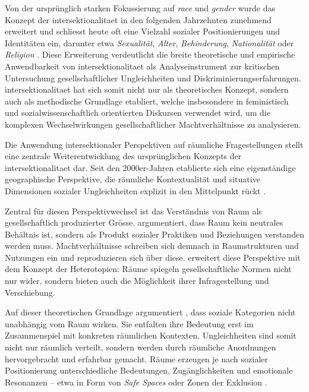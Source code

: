 Von der ursprünglich starken Fokussierung auf \textit{race} und \textit{gender} wurde das Konzept der \gls{intersektionalitaet} in den folgenden Jahrzehnten zunehmend erweitert und schliesst heute oft eine Vielzahl sozialer Positionierungen und Identitäten ein, darunter etwa \emph{Sexualität}, \emph{Alter}, \emph{Behinderung}, \emph{Nationalität} oder \emph{Religion} \parencite{bauerIntersectionalityQuantitativeResearch2021, bowlegInvitedReflectionQuantifying2016}. Diese Erweiterung verdeutlicht die breite theoretische und empirische Anwendbarkeit von \gls{intersektionalitaet} als Analyseinstrument zur kritischen Untersuchung gesellschaftlicher Ungleichheiten und Diskriminierungserfahrungen. \gls{intersektionalitaet} hat sich somit nicht nur als theoretisches Konzept, sondern auch als methodische Grundlage etabliert, welche insbesondere in feministisch und sozialwissenschaftlich orientierten Diskursen verwendet wird, um die komplexen Wechselwirkungen gesellschaftlicher Machtverhältnisse zu analysieren.

\vspace{2em}

Die Anwendung intersektionaler Perspektiven auf räumliche Fragestellungen stellt eine zentrale Weiterentwicklung des ursprünglichen Konzepts der \gls{intersektionalitaet} dar. Seit den 2000er-Jahren etablierte sich eine eigenständige geographische Perspektive, die räumliche Kontextualität und situative Dimensionen sozialer Ungleichheiten explizit in den Mittelpunkt rückt \parencite{valentineTheorizingResearchingIntersectionality2007,rodo-de-zarateIntersectionalityFeministGeographies2018}.

Zentral für diesen Perspektivwechsel ist das Verständnis von Raum als gesellschaftlich produzierter Grösse. \textcite{lefebvreProductionLespace1974} argumentiert, dass Raum kein neutrales Behältnis ist, sondern als Produkt sozialer Praktiken und Beziehungen verstanden werden muss. Machtverhältnisse schreiben sich demnach in Raumstrukturen und Nutzungen ein und reproduzieren sich über diese. \textcite{foucaultEspacesAutres2004} erweitert diese Perspektive mit dem Konzept der Heterotopien: Räume spiegeln gesellschaftliche Normen nicht nur wider, sondern bieten auch die Möglichkeit ihrer Infragestellung und Verschiebung.

Auf dieser theoretischen Grundlage argumentiert \textcite{valentineTheorizingResearchingIntersectionality2007}, dass soziale Kategorien nicht unabhängig vom Raum wirken. Sie entfalten ihre Bedeutung erst im Zusammenspiel mit konkreten räumlichen Kontexten. Ungleichheiten sind somit nicht nur räumlich verteilt, sondern werden durch räumliche Anordnungen hervorgebracht und erfahrbar gemacht. Räume erzeugen je nach sozialer Positionierung unterschiedliche Bedeutungen, Zugänglichkeiten und emotionale Resonanzen -- etwa in Form von \textit{Safe Spaces} oder Zonen der Exklusion \parencite[\gls{vgl}][]{rodo-de-zarateIntersectionalityFeministGeographies2018}.

